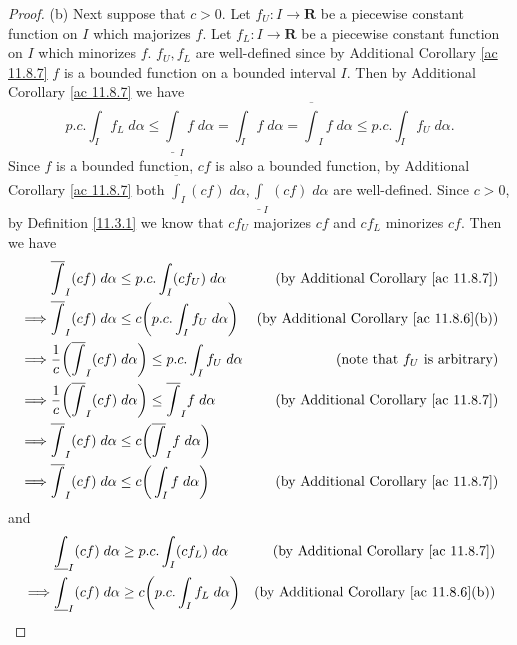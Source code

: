\begin{proof}{(b)}
    Next suppose that \(c > 0\).
    Let \(f_U : I \to \mathbf{R}\) be a piecewise constant function on \(I\) which majorizes \(f\).
    Let \(f_L : I \to \mathbf{R}\) be a piecewise constant function on \(I\) which minorizes \(f\).
    \(f_U, f_L\) are well-defined since by Additional Corollary \ref{ac 11.8.7} \(f\) is a bounded function on a bounded interval \(I\).
    Then by Additional Corollary \ref{ac 11.8.7} we have
    \[
        p.c. \int_I f_L \; d \alpha \leq \underline{\int}_I f \; d \alpha = \int_I f \; d \alpha = \overline{\int}_I f \; d \alpha \leq p.c. \int_I f_U \; d \alpha.
    \]
    Since \(f\) is a bounded function, \(cf\) is also a bounded function, by Additional Corollary \ref{ac 11.8.7} both \(\overline{\int}_I (cf) \; d \alpha, \underline{\int}_I (cf) \; d \alpha\) are well-defined.
    Since \(c > 0\), by Definition \ref{11.3.1} we know that \(c f_U\) majorizes \(c f\) and \(c f_L\) minorizes \(c f\).
    Then we have
    \begin{align*}
                 & \overline{\int}_I (cf) \; d \alpha \leq p.c. \int_I (c f_U) \; d \alpha                         & \text{(by Additional Corollary \ref{ac 11.8.7})}    \\
        \implies & \overline{\int}_I (cf) \; d \alpha \leq c \bigg(p.c. \int_I f_U \; d \alpha\bigg)               & \text{(by Additional Corollary \ref{ac 11.8.6}(b))} \\
        \implies & \frac{1}{c} \bigg(\overline{\int}_I (cf) \; d \alpha\bigg) \leq p.c. \int_I f_U \; d \alpha     & \text{(note that \(f_U\) is arbitrary)}             \\
        \implies & \frac{1}{c} \bigg(\overline{\int}_I (cf) \; d \alpha\bigg) \leq \overline{\int}_I f \; d \alpha & \text{(by Additional Corollary \ref{ac 11.8.7})}    \\
        \implies & \overline{\int}_I (cf) \; d \alpha \leq c\bigg(\overline{\int}_I f \; d \alpha\bigg)                                                                  \\
        \implies & \overline{\int}_I (cf) \; d \alpha \leq c\bigg(\int_I f \; d \alpha\bigg)                       & \text{(by Additional Corollary \ref{ac 11.8.7})}
    \end{align*}
    and
    \begin{align*}
                 & \underline{\int}_I (cf) \; d \alpha \geq p.c. \int_I (c f_L) \; d \alpha                          & \text{(by Additional Corollary \ref{ac 11.8.7})}    \\
        \implies & \underline{\int}_I (cf) \; d \alpha \geq c \bigg(p.c. \int_I f_L \; d \alpha\bigg)                & \text{(by Additional Corollary \ref{ac 11.8.6}(b))} \\

\end{align*}
\end{proof}
